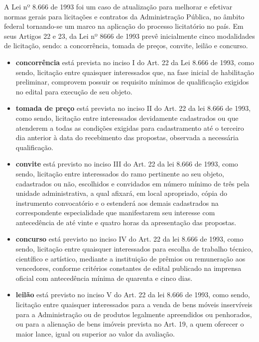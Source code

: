 A Lei nº 8.666 de 1993 foi um caso de atualização para melhorar e efetivar normas gerais para licitações e contratos da Administração Pública, no âmbito federal tornando-se um marco na aplicação do processo licitatório no país.
Em seus Artigos 22 e 23, da Lei nº 8666 de 1993 prevê inicialmente cinco modalidades de licitação, sendo: a concorrência, tomada de preços, convite, leilão e concurso.

\begin{itemize}
    \item \textbf{concorrência} está prevista no inciso I do Art. 22 da Lei 8.666 de 1993, como sendo, licitação entre quaisquer interessados que, na fase inicial de habilitação preliminar, comprovem possuir os requisito mínimos de qualificação exigidos no edital para execução de seu objeto.

    \item \textbf{tomada de preço} está prevista no inciso II do Art. 22 da lei 8.666 de 1993, como sendo, licitação entre interessados devidamente cadastrados ou que atenderem a todas as condições exigidas para cadastramento até o terceiro dia anterior à data do recebimento das propostas, observada a necessária qualificação.

    \item \textbf{convite} está previsto no inciso III do Art. 22 da lei 8.666 de 1993, como sendo, licitação entre interessados do ramo pertinente ao seu objeto, cadastrados ou não, escolhidos e convidados em número mínimo de três pela unidade administrativa, a qual afixará, em local apropriado, cópia do instrumento convocatório e o estenderá aos demais cadastrados na correspondente especialidade que manifestarem seu interesse com antecedência de até vinte e quatro horas da apresentação das propostas. 

    \item \textbf{concurso} está previsto no inciso IV do Art. 22 da lei 8.666 de 1993, como sendo, licitação entre quaisquer interessados para escolha de trabalho técnico, científico e artístico, mediante a instituição de prêmios ou remuneração aos vencedores, conforme critérios constantes de edital publicado na imprensa oficial com antecedência mínima de quarenta e cinco dias. 

    \item \textbf{leilão} está previsto no inciso V do Art. 22 da lei 8.666 de 1993, como sendo, licitação entre quaisquer interessados para a venda de bens móveis inservíveis para a Administração ou de produtos legalmente apreendidos ou penhorados, ou para a alienação de bens imóveis prevista no Art. 19, a quem oferecer o maior lance, igual ou superior ao valor da avaliação. 
\end{itemize}

